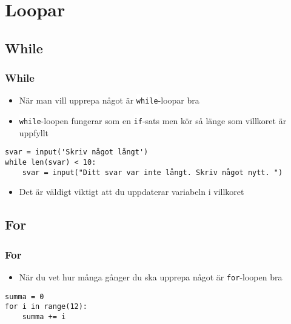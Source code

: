 \documentclass[aspectratio=169]{beamer}
\newcommand{\code}[1]{\colorbox{white}{\lstinline{#1}}}
\begin{document}
\section{Loopar}

\subsection{While}

\begin{frame}[fragile]
	\frametitle{While}

	\begin{itemize}
		\item När man vill upprepa något är \code{while}-loopar bra
		\item \code{while}-loopen fungerar som en \code{if}-sats men kör så länge som villkoret är uppfyllt
	\end{itemize}
	
	\begin{lstlisting}
svar = input('Skriv något långt')
while len(svar) < 10:
    svar = input("Ditt svar var inte långt. Skriv något nytt. ")
	\end{lstlisting}
	
	\begin{itemize}
		\item Det är väldigt viktigt att du uppdaterar variabeln i villkoret
	\end{itemize}

\end{frame}

\subsection{For}

\begin{frame}[fragile]
	\frametitle{For}
	
	\begin{itemize}
		\item När du vet hur många gånger du ska upprepa något är \code{for}-loopen bra
	\end{itemize}
	
	\begin{lstlisting}
summa = 0
for i in range(12):
    summa += i
	\end{lstlisting}
	
\end{frame}
\end{document}
